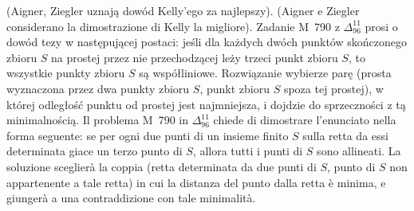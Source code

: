 %
(Aigner, Ziegler uznają dowód Kelly'ego za najlepszy). %
(Aigner e Ziegler considerano la dimostrazione di Kelly la migliore). %
Zadanie M~790 z $\Delta_{96}^{11}$ prosi o dowód tezy w następującej postaci: jeśli dla każdych dwóch punktów skończonego zbioru $S$ na prostej przez nie przechodzącej leży trzeci punkt zbioru $S$, to wszystkie punkty zbioru $S$ są współliniowe. Rozwiązanie wybierze parę (prosta wyznaczona przez dwa punkty zbioru $S$, punkt zbioru $S$ spoza tej prostej), w której odległość punktu od prostej jest najmniejsza, i dojdzie do sprzeczności z tą minimalnością. %
Il problema M~790 in $\Delta_{96}^{11}$ chiede di dimostrare l'enunciato nella forma seguente: se per ogni due punti di un insieme finito $S$ sulla retta da essi determinata giace un terzo punto di $S$, allora tutti i punti di $S$ sono allineati. La soluzione sceglierà la coppia (retta determinata da due punti di $S$, punto di $S$ non appartenente a tale retta) in cui la distanza del punto dalla retta è minima, e giungerà a una contraddizione con tale minimalità. %

